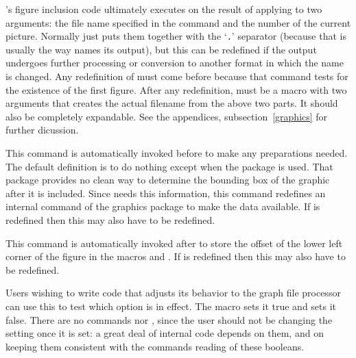 \documentclass[letterpaper]{article}
\begin{document}
\Mfp's figure inclusion code ultimately executes
 on the result of applying  to two
arguments: the file name specified in the  command
and the number of the current picture. Normally  just
puts them together with the `\texttt{.}' separator (because that is
usually the way \MP{} names its output), but this can be redefined if
the \MP{} output undergoes further processing or conversion to another
format in which the name is changed. Any redefinition of
 must come before  because that
command tests for the existence of the first figure. After any
redefinition,  must be a macro with two arguments that
creates the actual filename from the above two parts. It should also be
completely expandable. See the appendices, subsection~\ref{graphics} for
further dicussion.

\begin{cd}
%
\end{cd}

This command is automatically invoked before  to
make any preparations needed. The default definition is to do nothing
except when the  package is used. That package provides
no clean way to determine the bounding box of the graphic after it is
included. Since \mfp{} needs this information, this command
redefines an internal command of the graphics package to make the data
available. If  is redefined then this may also have
to be redefined.

\begin{cd}
%
\end{cd}

This command is automatically invoked after  to
store the offset of the lower left corner of the figure in the macros
 and . If  is redefined
then this may also have to be redefined.

\begin{cd}
%
\end{cd}

Users wishing to write code that adjusts its behavior to the graph file
processor can use this to test which option is in effect. The macro
 sets it true and  sets it false. There
are no commands  nor , since the user
should not be changing the setting once it is set: a great deal of
\mfp{} internal code depends on them, and on keeping them consistent
with the  commands reading of these booleans.
\end{document}
